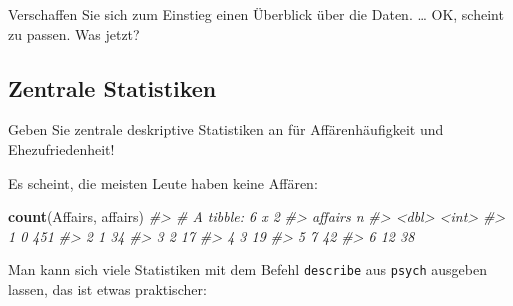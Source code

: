 \documentclass[12pt,ngerman,]{book}
\makeatletter
\newenvironment{Shaded}{\begin{snugshade}}{\end{snugshade}}
\newcommand{\KeywordTok}[1]{\textcolor[rgb]{0.13,0.29,0.53}{\textbf{#1}}}
\newcommand{\DataTypeTok}[1]{\textcolor[rgb]{0.13,0.29,0.53}{#1}}
\newcommand{\CommentTok}[1]{\textcolor[rgb]{0.56,0.35,0.01}{\textit{#1}}}
\newcommand{\OperatorTok}[1]{\textcolor[rgb]{0.81,0.36,0.00}{\textbf{#1}}}
\newcommand{\NormalTok}[1]{#1}
\newenvironment{kframe}{%
\medskip{}
\setlength{\fboxsep}{.8em}
 \def\at@end@of@kframe{}%
 \ifinner\ifhmode%
  \def\at@end@of@kframe{\end{minipage}}%
  \begin{minipage}{\columnwidth}%
 \fi\fi%
 \def\FrameCommand##1{\hskip\@totalleftmargin \hskip-\fboxsep
 \colorbox{shadecolor}{##1}\hskip-\fboxsep
     \hskip-\linewidth \hskip-\@totalleftmargin \hskip\columnwidth}%
 \MakeFramed {\advance\hsize-\width
   \@totalleftmargin\z@ \linewidth\hsize
   \@setminipage}}%
 {\par\unskip\endMakeFramed%
 \at@end@of@kframe}
\renewenvironment{Shaded}{\begin{kframe}}{\end{kframe}}
\theoremstyle{definition}
\theoremstyle{definition}
\theoremstyle{remark}
\makeatother
\begin{document}
Verschaffen Sie sich zum Einstieg einen Überblick über die Daten.
\ldots{} OK, scheint zu passen. Was jetzt?

\subsection{Zentrale Statistiken}\label{zentrale-statistiken}

Geben Sie zentrale deskriptive Statistiken an für Affärenhäufigkeit und
Ehezufriedenheit!

\begin{Shaded}
\end{Shaded}

Es scheint, die meisten Leute haben keine Affären:

\begin{Shaded}
\begin{Highlighting}[]
\KeywordTok{count}\NormalTok{(Affairs, affairs)}
\CommentTok{#> # A tibble: 6 x 2}
\CommentTok{#>   affairs     n}
\CommentTok{#>     <dbl> <int>}
\CommentTok{#> 1       0   451}
\CommentTok{#> 2       1    34}
\CommentTok{#> 3       2    17}
\CommentTok{#> 4       3    19}
\CommentTok{#> 5       7    42}
\CommentTok{#> 6      12    38}
\end{Highlighting}
\end{Shaded}

Man kann sich viele Statistiken mit dem Befehl \texttt{describe} aus
\texttt{psych} ausgeben lassen, das ist etwas praktischer:

\begin{Shaded}
\end{Shaded}
\end{document}
